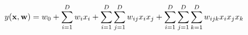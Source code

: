 $$y({\textbf x},{\textbf w})=w_0 +
  \sum_{i=1}^{D}{w_i x_i} +
  \sum_{i=1}^{D}{\sum_{j=1}^{D}{w_{ij} x_i x_j}} +
  \sum_{i=1}^{D}{\sum_{j=1}^{D}{\sum_{k=1}^{D}{w_{ijk} x_i x_j x_k}}}
$$
